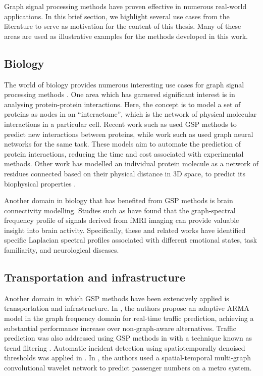 Graph signal processing methods have proven effective in numerous real-world applications. In this brief section, we highlight several use cases from the literature to serve as motivation for the content of this thesis. Many of these areas are used as illustrative examples for the methods developed in this work.


\subsection{Biology}

The world of biology provides numerous interesting use cases for graph signal processing methods \citep{Li2023}. One area which has garnered significant interest is in analysing protein-protein interactions. Here, the concept is to model a set of proteins as nodes in an ``interactome'', which is the network of physical molecular interactions in a particular cell. Recent work such as \cite{Colonnese2021} used GSP methods to predict new interactions between proteins, while work such as \cite{Jha2022} used graph neural networks for the same task. These models aim to automate the prediction of protein interactions, reducing the time and cost associated with experimental methods. Other work has modelled an individual protein molecule as a network of residues connected based on their physical distance in 3D space, to predict its biophysical properties \citep{Srivastava2023}. 

Another domain in biology that has benefited from GSP methods is brain connectivity modelling. Studies such as \cite{Goldsberry2017, Atasoy2016, Menoret2017, Itani2021} have found that the graph-spectral frequency profile of signals derived from fMRI imaging can provide valuable insight into brain activity. Specifically, these and related works have identified specific Laplacian spectral profiles associated with different emotional states, task familiarity, and neurological diseases.

\subsection{Transportation and infrastructure}

Another domain in which GSP methods have been extensively applied is transportation and infrastructure. In \cite{Hasanzadeh2017}, the authors propose an adaptive ARMA model in the graph frequency domain for real-time traffic prediction, achieving a substantial performance increase over non-graph-aware alternatives. Traffic prediction was also addressed using GSP methods in \cite{Chakraborty2017} with a technique known as trend filtering \citep{Wang2016}. Automatic incident detection using spatiotemporally denoised thresholds was applied in \cite{Chakraborty2019}. In \cite{Xiu2022}, the authors used a spatial-temporal multi-graph convolutional wavelet network to predict passenger numbers on a metro system.

